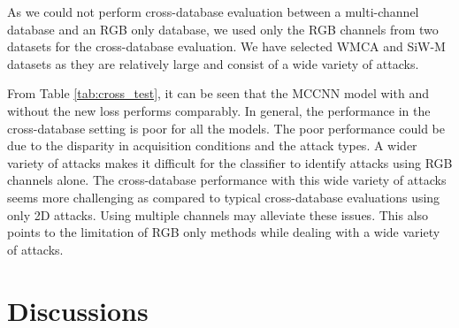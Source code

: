 \documentclass[journal]{IEEEtran}
\begin{document}
As we could not perform cross-database evaluation between a multi-channel database and an RGB only database, we used only the RGB channels from two datasets for the cross-database evaluation. We have selected WMCA and SiW-M datasets as they are relatively large and consist of a wide variety of attacks.

From Table \ref{tab:cross_test}, it can be seen that the MCCNN model with and without the new loss performs comparably. In general, the performance in the cross-database setting is poor for all the models. The poor performance could be due to the disparity in acquisition conditions and the attack types. A wider variety of attacks makes it difficult for the classifier to identify attacks using RGB channels alone. The cross-database performance with this wide variety of attacks seems more challenging as compared to typical cross-database evaluations using only 2D attacks. Using multiple channels \cite{george_mccnn_tifs2019} may alleviate these issues. This also points to the limitation of RGB only methods while dealing with a wide variety of attacks.

\section{Discussions}
\end{document}
